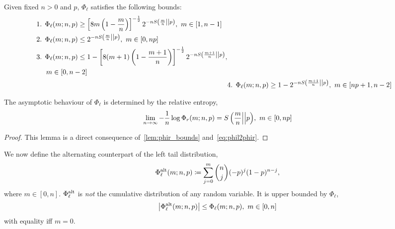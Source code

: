 \documentclass[pra,
aps,
twocolumn,
superscriptaddress,
groupedaddress,
nofootinbib,
reprint
]{revtex4-1}
\begin{document}
\begin{lemma}\label{lem:phil_bounds}
	Given fixed $n>0$ and $p$, $\Phi_\ell$ satisfies the following bounds:
	\begin{align*}
		\begin{split}
		&\text{1. } \Phi_\ell(m; n, p) \geq \left[ 8m\left(1-\frac{m}{n}\right) \right]^{-\frac{1}{2}} 2^{-n{S\left( \frac{m}{n} \middle\vert\middle\vert p \right)}},\ m\in [1,n-1] \\
		&\text{2. } \Phi_\ell(m; n, p) \leq 2^{-n{S\left( \frac{m}{n} \middle\vert\middle\vert p \right)}},\ m\in [0,np] \\
		&\text{3. } \Phi_\ell(m; n, p) \leq 1 - \left[ 8(m+1)\left(1-\frac{m+1}{n}\right) \right]^{-\frac{1}{2}} 2^{-nS\left( \frac{m+1}{n} \middle\vert\middle\vert p \right)}, \\
		&\hspace{14pt} m\in [0,n-2]
		\end{split}
		\\
		&\text{4. } \Phi_\ell(m; n, p) \geq 1 - 2^{-nS\left( \frac{m+1}{n} \middle\vert\middle\vert p \right)},\ m\in [np+1,n-2]
	\end{align*}
	
	The asymptotic behaviour of $\Phi_\ell$ is determined by the relative entropy,
	\begin{equation}
		\lim_{n\rightarrow\infty}{-\frac{1}{n}\log{\Phi_r(m; n, p)} = S\left( \frac{m}{n} \middle\vert\middle\vert p \right)},\ m\in [0,np]
	\end{equation}
\end{lemma}
\begin{proof}
	This lemma is a direct consequence of~\cref{lem:phir_bounds} and~\cref{eq:phil2phir}.
\end{proof}

We now define the alternating counterpart of the left tail distribution,
\begin{equation}\label{eq:phialt}
	\Phi_\ell^{\rm{alt}}(m; n, p) \coloneqq \sum\limits_{j=0}^m \binom{n}{j} (-p)^j (1-p)^{n-j},
\end{equation}
where $m\in [0,n]$.
$\Phi_\ell^{\rm{alt}}$ is \emph{not} the cumulative distribution of any random variable.
It is upper bounded by $\Phi_\ell$,
\begin{equation}\label{eq:phialt_bound}
	\abs{\Phi_\ell^{\rm{alt}}(m; n, p)} \leq \Phi_\ell(m; n, p),\ m\in [0,n]
\end{equation}
with equality iff $m=0$.
\end{document}
